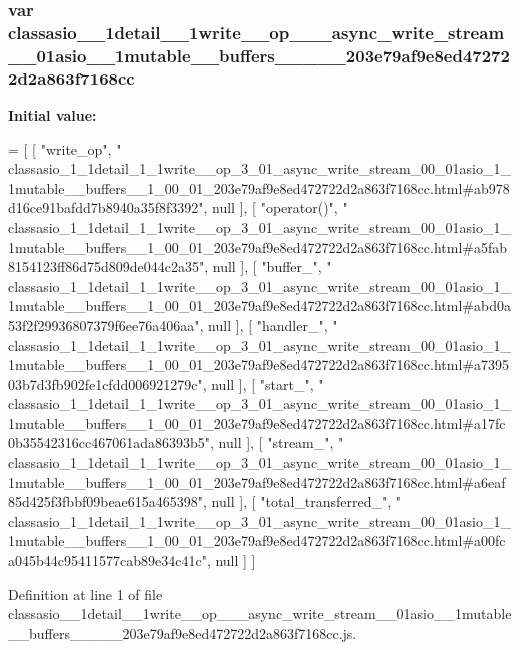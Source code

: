 \subsubsection[{classasio\+\_\+1\+\_\+1detail\+\_\+1\+\_\+1write\+\_\+\+\_\+op\+\_\+3\+\_\+01\+\_\+async\+\_\+write\+\_\+stream\+\_\+00\+\_\+01asio\+\_\+1\+\_\+1mutable\+\_\+\+\_\+buffers\+\_\+\+\_\+1\+\_\+00\+\_\+01\+\_\+203e79af9e8ed472722d2a863f7168cc}]{\setlength{\rightskip}{0pt plus 5cm}var classasio\+\_\+\_\+1detail\+\_\+\_\+1write\+\_\+\+\_\+op\+\_\+\_\+\_\+async\+\_\+write\+\_\+stream\+\_\+\_\+01asio\+\_\+\_\+1mutable\+\_\+\+\_\+buffers\+\_\+\+\_\+\_\+\_\+\_\+203e79af9e8ed472722d2a863f7168cc}\label{classasio__1__1detail__1__1write____op__3__01__async__write__stream__00__01asio__1__1mutable____a81dbff3122095366851197319b54fd7_a3e2932a1238e68ced6de146cba5a8d70}
{\bfseries Initial value\+:}
\begin{DoxyCode}
=
[
    [ \textcolor{stringliteral}{"write\_op"}, \textcolor{stringliteral}{"
      classasio\_1\_1detail\_1\_1write\_\_op\_3\_01\_async\_write\_stream\_00\_01asio\_1\_1mutable\_\_buffers\_\_1\_00\_01\_203e79af9e8ed472722d2a863f7168cc.html#ab978d16ce91bafdd7b8940a35f8f3392"}, null ],
    [ \textcolor{stringliteral}{"operator()"}, \textcolor{stringliteral}{"
      classasio\_1\_1detail\_1\_1write\_\_op\_3\_01\_async\_write\_stream\_00\_01asio\_1\_1mutable\_\_buffers\_\_1\_00\_01\_203e79af9e8ed472722d2a863f7168cc.html#a5fab8154123ff86d75d809de044c2a35"}, null ],
    [ \textcolor{stringliteral}{"buffer\_"}, \textcolor{stringliteral}{"
      classasio\_1\_1detail\_1\_1write\_\_op\_3\_01\_async\_write\_stream\_00\_01asio\_1\_1mutable\_\_buffers\_\_1\_00\_01\_203e79af9e8ed472722d2a863f7168cc.html#abd0a53f2f29936807379f6ee76a406aa"}, null ],
    [ \textcolor{stringliteral}{"handler\_"}, \textcolor{stringliteral}{"
      classasio\_1\_1detail\_1\_1write\_\_op\_3\_01\_async\_write\_stream\_00\_01asio\_1\_1mutable\_\_buffers\_\_1\_00\_01\_203e79af9e8ed472722d2a863f7168cc.html#a739503b7d3fb902fe1cfdd006921279c"}, null ],
    [ \textcolor{stringliteral}{"start\_"}, \textcolor{stringliteral}{"
      classasio\_1\_1detail\_1\_1write\_\_op\_3\_01\_async\_write\_stream\_00\_01asio\_1\_1mutable\_\_buffers\_\_1\_00\_01\_203e79af9e8ed472722d2a863f7168cc.html#a17fc0b35542316cc467061ada86393b5"}, null ],
    [ \textcolor{stringliteral}{"stream\_"}, \textcolor{stringliteral}{"
      classasio\_1\_1detail\_1\_1write\_\_op\_3\_01\_async\_write\_stream\_00\_01asio\_1\_1mutable\_\_buffers\_\_1\_00\_01\_203e79af9e8ed472722d2a863f7168cc.html#a6eaf85d425f3fbbf09beae615a465398"}, null ],
    [ \textcolor{stringliteral}{"total\_transferred\_"}, \textcolor{stringliteral}{"
      classasio\_1\_1detail\_1\_1write\_\_op\_3\_01\_async\_write\_stream\_00\_01asio\_1\_1mutable\_\_buffers\_\_1\_00\_01\_203e79af9e8ed472722d2a863f7168cc.html#a00fca045b44c95411577cab89e34c41c"}, null ]
]
\end{DoxyCode}


Definition at line 1 of file classasio\+\_\+\_\+1detail\+\_\+\_\+1write\+\_\+\+\_\+op\+\_\+\_\+\_\+async\+\_\+write\+\_\+stream\+\_\+\_\+01asio\+\_\+\_\+1mutable\+\_\+\+\_\+buffers\+\_\+\+\_\+\_\+\_\+\_\+203e79af9e8ed472722d2a863f7168cc.\+js.

